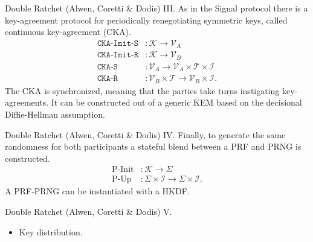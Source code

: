 \documentclass{beamer}
\renewcommand{\t}{\text}
\begin{document}
\begin{frame}{Double Ratchet (Alwen, Coretti \& Dodis) III.}
  As in the Signal protocol there is a key-agreement protocol for periodically
  renegotiating symmetric keys, called continuous key-agreement (CKA).
  \begin{align*}
    \texttt{CKA-Init-S} & : \mathcal{K} \rightarrow \mathcal{V}_A \\
    \texttt{CKA-Init-R} & : \mathcal{K} \rightarrow \mathcal{V}_B \\
    \texttt{CKA-S} & : \mathcal{V}_A \rightarrow
                \mathcal{V}_A \times \mathcal{T} \times \mathcal{I} \\
    \texttt{CKA-R} & : \mathcal{V}_B \times \mathcal{T} \rightarrow
                \mathcal{V}_B \times \mathcal{I}.
  \end{align*}
  The CKA is synchronized, meaning that the parties take turns instigating
  key-agreements. It can be constructed out of a generic KEM based on
  the decisional Diffie-Hellman assumption.
\end{frame}

\begin{frame}{Double Ratchet (Alwen, Coretti \& Dodis) IV.}
  Finally, to generate the same randomness for both participants a stateful
  blend between a PRF and PRNG is constructed.
  \begin{align*}
    \t{P-Init} & : \mathcal{K} \rightarrow \Sigma \\
    \t{P-Up} & : \Sigma \times \mathcal{I} \rightarrow \Sigma \times \mathcal{I}.
  \end{align*}
  A PRF-PRNG can be instantiated with a HKDF.
\end{frame}

\begin{frame}{Double Ratchet (Alwen, Coretti \& Dodis) V.}
  \scriptsize
   \begin{minipage}[h]{0.49\textwidth}
      \begin{figure}[h]
        \centering
        \setlength{\fboxsep}{10pt}
        \scalebox{0.7}{%
        \fbox{%
          
        }
      }
    \end{figure}
    \end{minipage}
   \begin{minipage}[h]{0.49\textwidth}
      \begin{itemize}
      \item Key distribution.
      \end{itemize}
  \end{minipage}
\end{frame}
\end{document}

